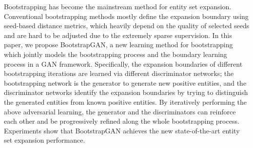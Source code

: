 Bootstrapping has become the mainstream method for entity set expansion. Conventional bootstrapping methods mostly define the expansion boundary using seed-based distance metrics, which heavily depend on the quality of selected seeds and are hard to be adjusted due to the extremely sparse supervision. In this paper, we propose BootstrapGAN, a new learning method for bootstrapping which jointly models the bootstrapping process and the boundary learning process in a GAN framework. Specifically, the expansion boundaries of different bootstrapping iterations are learned via different discriminator networks; the bootstrapping network is the generator to generate new positive entities, and the discriminator networks identify the expansion boundaries by trying to distinguish the generated entities from known positive entities. By iteratively performing the above adversarial learning, the generator and the discriminators can reinforce each other and be progressively refined along the whole bootstrapping process. Experiments show that BootstrapGAN achieves the new state-of-the-art entity set expansion performance.

